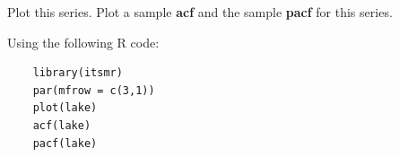 Plot this series. Plot a sample \textbf{acf} and the sample \textbf{pacf} for this series.


Using the following R code:
\begin{verbatim}
    library(itsmr)
    par(mfrow = c(3,1))
    plot(lake)
    acf(lake)
    pacf(lake)
\end{verbatim}
